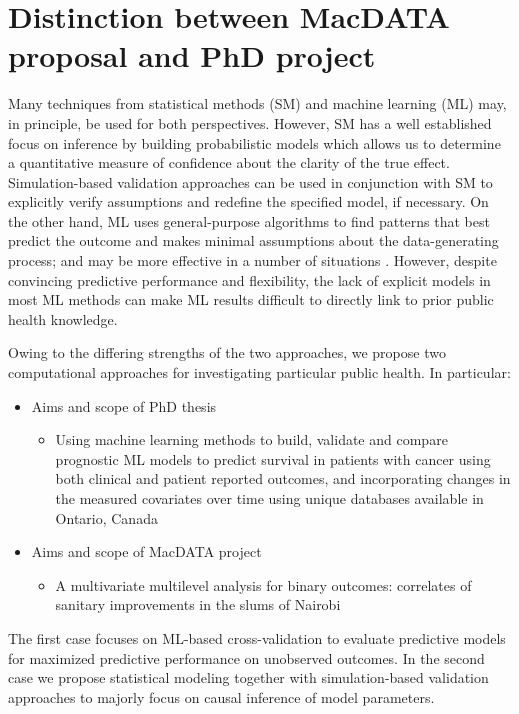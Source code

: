 \section{Distinction between MacDATA proposal and PhD project}

Many techniques from statistical methods (SM) and machine learning (ML) may, in principle, be used for both perspectives. However, SM has a well established focus on inference by building probabilistic models which allows us to determine a quantitative measure of confidence about the clarity of the true effect. Simulation-based validation approaches can be used in conjunction with SM to explicitly verify assumptions and redefine the specified model, if necessary. On the other hand, ML uses general-purpose algorithms to find patterns that best predict the outcome and makes minimal assumptions about the data-generating process; and may be more effective in a number of situations \citep{bzdok2018points}. However, despite convincing predictive performance and flexibility, the lack of explicit models in most ML methods can make ML results difficult to directly link to prior public health knowledge.

Owing to the differing strengths of the two approaches, we propose two computational approaches for investigating particular public health. In particular:

\begin{itemize}
\item Aims and scope of PhD thesis
\begin{itemize}
\item Using machine learning methods to build, validate and compare prognostic ML models to predict survival in patients with cancer using both clinical and patient reported outcomes, and incorporating changes in the measured covariates over time using unique databases available in Ontario, Canada
\end{itemize}
\item Aims and scope of MacDATA project
\begin{itemize}
\item A multivariate multilevel analysis for binary outcomes: correlates of sanitary improvements in the slums of Nairobi
\end{itemize}
\end{itemize}
The first case focuses on ML-based cross-validation to evaluate predictive models for maximized predictive performance on unobserved outcomes. In the second case we propose statistical modeling together with simulation-based validation approaches to majorly focus on causal inference of model parameters.

